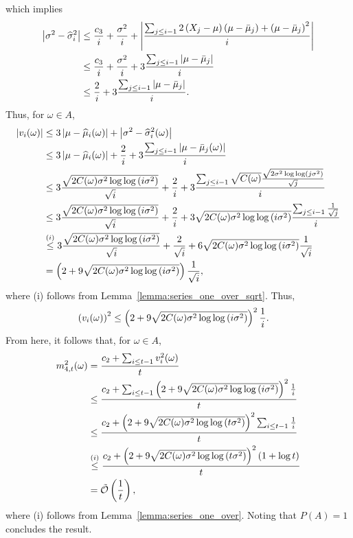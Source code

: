     which implies
    \begin{align*}
        \left| \sigma^2 - \widehat\sigma_i^2 \right| &\leq  \frac{c_3}{i} + \frac{\sigma^2}{i}  + \left| \frac{ \sum_{j \leq i -1} 2\left( X_j - \mu \right)\left( \mu - \bar\mu_j \right) + \left( \mu - \bar\mu_j \right)^2}{i} \right|
        \\&\leq  \frac{c_3}{i} + \frac{\sigma^2}{i}  + 3\frac{ \sum_{j \leq i -1} \left| \mu - \bar\mu_j \right|}{i}
        \\&\stackrel{}{\leq}  \frac{2}{i}  + 3\frac{ \sum_{j \leq i -1} \left| \mu - \bar\mu_j \right|}{i}.
    \end{align*}
    Thus, for $\omega \in A$,
    \begin{align*}
        \left| v_i (\omega)\right|  &\leq  3\left| \mu-\widehat\mu_i (\omega)\right| + \left| \sigma^2 - \widehat\sigma_i^2(\omega) \right|
        \\&\leq 3 \left| \mu-\widehat\mu_i(\omega) \right| + \frac{2}{i} + 3\frac{ \sum_{j \leq i -1} \left| \mu - \bar\mu_j (\omega) \right|}{i}
        \\&\leq 3\frac{\sqrt{ 2C(\omega)  \sigma^2 \log \log \left( i \sigma^2 \right) }}{\sqrt i} + \frac{2}{i} + 3\frac{ \sum_{j \leq i -1} \sqrt{C(\omega)}\frac{\sqrt{2 \sigma^2 \log \log \left( j \sigma^2 \right) }}{\sqrt j}}{i}
        \\&\leq 3\frac{\sqrt{2C(\omega) \sigma^2 \log \log \left( i \sigma^2 \right) }}{\sqrt i} + \frac{2}{i} + 3 \sqrt{2 C(\omega) \sigma^2 \log \log \left( i \sigma^2 \right) } \frac{ \sum_{j \leq i -1} \frac{1}{\sqrt j}}{i}
        \\&\stackrel{(i)}{\leq} 3\frac{\sqrt{2C(\omega) \sigma^2 \log \log \left( i \sigma^2 \right) }}{\sqrt i} + \frac{2}{\sqrt{i}} + 6 \sqrt{2 C(\omega) \sigma^2 \log \log \left( i \sigma^2 \right) } \frac{1 }{\sqrt{i}}
        \\&\stackrel{}{=} \left( 2 + 9 \sqrt{2 C(\omega) \sigma^2 \log \log \left( i \sigma^2 \right) }\right) \frac{1 }{\sqrt{i}},
    \end{align*}
    where (i) follows from Lemma~\ref{lemma:series_one_over_sqrt}.
    Thus,
    \begin{align*}
        \left( v_i (\omega)\right)^2  &\leq \left( 2 + 9 \sqrt{2 C(\omega) \sigma^2 \log \log \left( i \sigma^2 \right) }\right)^2 \frac{1 }{i}.
    \end{align*}
    From here, it follows that, for $\omega \in A$,
    \begin{align*}
        m_{4, t}^2(\omega) &= \frac{c_2 + \sum_{i \leq t-1} v_i^2(\omega)}{t} 
        \\&\leq \frac{c_2 + \sum_{i \leq t-1} \left( 2 + 9 \sqrt{2 C(\omega) \sigma^2 \log \log \left( i \sigma^2 \right) }\right)^2 \frac{1 }{i}}{t}
        \\&\leq \frac{c_2 + \left( 2 + 9 \sqrt{2 C(\omega) \sigma^2 \log \log \left( t \sigma^2 \right) }\right)^2 \sum_{i \leq t-1}  \frac{1 }{i}}{t}
        \\&\stackrel{(i)}{\leq} \frac{c_2 + \left( 2 + 9 \sqrt{2 C(\omega) \sigma^2 \log \log \left( t \sigma^2 \right) }\right)^2 \left(1 + \log t\right)}{t}
        \\&= \tilde{\mathcal{O}}\left(\frac{1}{t}\right),
    \end{align*}
    where (i) follows from Lemma~\ref{lemma:series_one_over}. Noting that $P(A) = 1$ concludes the result.



